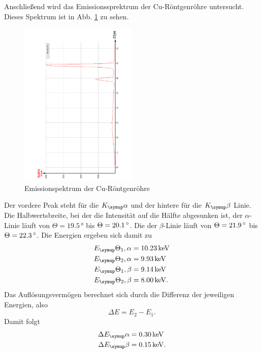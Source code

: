 Anschließend wird das Emissionssprektrum der Cu-Röntgenröhre untersucht.
Dieses Spektrum ist in Abb. \ref{fig:EmissionCu} zu sehen.
\begin{figure}
  \centering
  \includegraphics[width=0.5\textwidth, angle=270]{bilder/EmissionCu.pdf}
  \caption{Emissionspektrum der Cu-Röntgenröhre}
  \label{fig:EmissionCu}
\end{figure}
Der vordere Peak steht für die $K_\su{\alpha}$ und der hintere für die $K_\su{\beta}$
Linie. Die Halbwertsbreite, bei der die Intensität auf die Hälfte abgesunken ist,
der $\alpha$-Linie läuft von $\Theta = 19.5\,\si{\degree}$ bis $\Theta = 20.1\,\si{\degree}$.
Die der $\beta$-Linie läuft von $\Theta = 21.9\,\si{\degree}$ bis $\Theta = 22.3\,\si{\degree}$.
Die Energien ergeben sich damit zu
\begin{align}
  E_\su{\Theta_1, \alpha} &= 10.23 \keV \\
  E_\su{\Theta_2, \alpha} &= 9.93 \keV \\
  E_\su{\Theta_1, \beta} &= 9.14 \keV \\
  E_\su{\Theta_2, \beta} &= 8.00 \keV. \\
\end{align}
Das Auflösungsvermögen berechnet sich durch die Differenz der jeweiligen Energien,
also
\begin{equation}
  \Delta E = E_2 - E_1.
\end{equation}
Damit folgt
\begin{align}
  \Delta E_\su{\alpha} &= 0.30 \keV  \\
  \Delta E_\su{\beta} &= 0.15 \keV. \\
\end{align}





